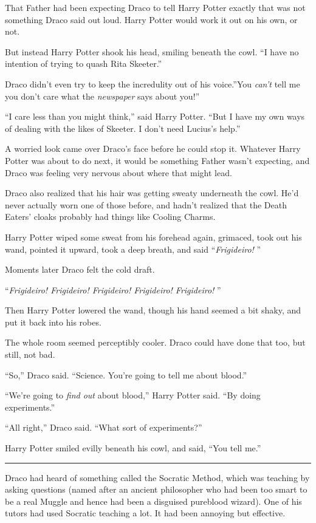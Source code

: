 That Father had been expecting Draco to tell Harry Potter exactly that
was not something Draco said out loud. Harry Potter would work it out on
his own, or not.

But instead Harry Potter shook his head, smiling beneath the cowl. ``I
have no intention of trying to quash Rita Skeeter.''

Draco didn't even try to keep the incredulity out of his voice.''You
\emph{can't} tell me you don't care what the \emph{newspaper} says about
you!''

``I care less than you might think,'' said Harry Potter. ``But I have my
own ways of dealing with the likes of Skeeter. I don't need Lucius's
help.''

A worried look came over Draco's face before he could stop it. Whatever
Harry Potter was about to do next, it would be something Father wasn't
expecting, and Draco was feeling very nervous about where that might
lead.

Draco also realized that his hair was getting sweaty underneath the
cowl. He'd never actually worn one of those before, and hadn't realized
that the Death Eaters' cloaks probably had things like Cooling Charms.

Harry Potter wiped some sweat from his forehead again, grimaced, took
out his wand, pointed it upward, took a deep breath, and said
``\emph{Frigideiro!} ''

Moments later Draco felt the cold draft.

``\emph{Frigideiro! Frigideiro! Frigideiro! Frigideiro! Frigideiro!} ''

Then Harry Potter lowered the wand, though his hand seemed a bit shaky,
and put it back into his robes.

The whole room seemed perceptibly cooler. Draco could have done that
too, but still, not bad.

``So,'' Draco said. ``Science. You're going to tell me about blood.''

``We're going to \emph{find out} about blood,'' Harry Potter said. ``By
doing experiments.''

``All right,'' Draco said. ``What sort of experiments?''

Harry Potter smiled evilly beneath his cowl, and said, ``You tell me.''

\begin{center}\rule{3in}{0.4pt}\end{center}

Draco had heard of something called the Socratic Method, which was
teaching by asking questions (named after an ancient philosopher who had
been too smart to be a real Muggle and hence had been a disguised
pureblood wizard). One of his tutors had used Socratic teaching a lot.
It had been annoying but effective.

